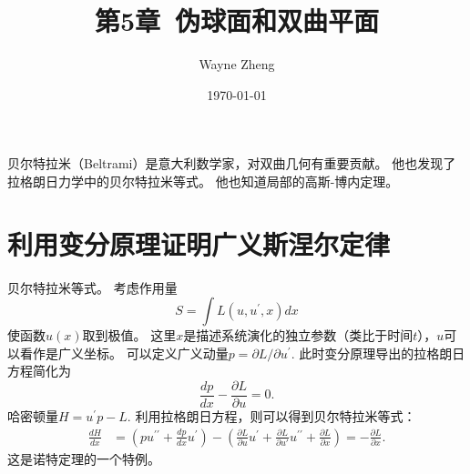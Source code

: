 \documentclass{article}
\title{第5章~伪球面和双曲平面}
\author{Wayne Zheng}
\date{\today}
\begin{document}
\maketitle

贝尔特拉米（Beltrami）是意大利数学家，对双曲几何有重要贡献。
他也发现了拉格朗日力学中的贝尔特拉米等式。
他也知道局部的高斯-博内定理。

\section{利用变分原理证明广义斯涅尔定律}

\begin{tcolorbox}[colback=white, arc=3mm, auto outer arc]
\begin{minipage}[c,t]{1.0\textwidth}
\kaishu
贝尔特拉米等式。
考虑作用量
\begin{equation*}
    S=\int{L}(u, u^{\prime}, x)dx
\end{equation*}
使函数$u(x)$取到极值。
这里$x$是描述系统演化的独立参数（类比于时间$t$），$u$可以看作是广义坐标。
可以定义广义动量$p=\partial{L}/\partial{u^{\prime}}$.
此时变分原理导出的拉格朗日方程简化为
\begin{equation*}
    \frac{dp}{dx}-\frac{\partial{L}}{\partial{u}}=0.
\end{equation*}
哈密顿量$H=u^{\prime}p-L$.
利用拉格朗日方程，则可以得到贝尔特拉米等式：
\begin{equation*}
\begin{aligned}
\frac{dH}{dx}
&=\left(pu^{\prime\prime}+\frac{dp}{dx}u^{\prime}\right)-\left(\frac{\partial{L}}{\partial{u}}u^{\prime}+\frac{\partial{L}}{\partial{u\prime}}u^{\prime\prime}+\frac{\partial{L}}{\partial{x}}\right)=-\frac{\partial{L}}{\partial{x}}.
\end{aligned}
\end{equation*}
这是诺特定理的一个特例。
\end{minipage}
\end{tcolorbox}
\end{document}
